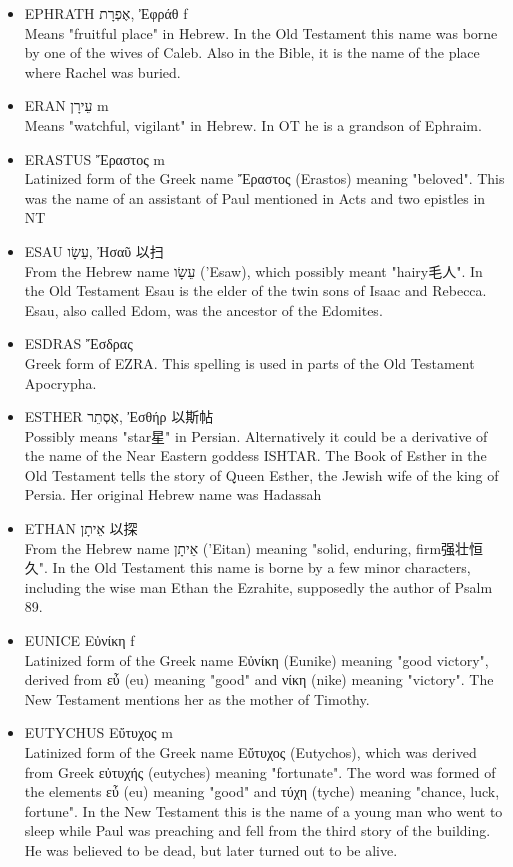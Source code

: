 \begin{itemize}
\item {EPHRATH אֶפְרָת, Ἐφράθ f}\\
Means "fruitful place" in Hebrew. In the Old Testament this name was borne by one of the wives of Caleb. Also in the Bible, it is the name of the place where Rachel was buried.

\item {ERAN עֵירָן m}\\
Means "watchful, vigilant" in Hebrew. In OT he is a grandson of Ephraim.

\item {ERASTUS Ἔραστος m}\\
Latinized form of the Greek name Ἔραστος (Erastos) meaning "beloved". This was the name of an assistant of Paul mentioned in Acts and two epistles in NT

\item {ESAU עֵשָׂו, Ἠσαῦ 以扫}\\
From the Hebrew name עֵשָׂו ('Esaw), which possibly meant "hairy毛人". In the Old Testament Esau is the elder of the twin sons of Isaac and Rebecca. Esau, also called Edom, was the ancestor of the Edomites.

\item {ESDRAS Ἔσδρας }\\
Greek form of EZRA. This spelling is used in parts of the Old Testament Apocrypha.

\item {ESTHER אֶסְתֵר, Ἐσθήρ 以斯帖}\\
Possibly means "star星" in Persian. Alternatively it could be a derivative of the name of the Near Eastern goddess ISHTAR. The Book of Esther in the Old Testament tells the story of Queen Esther, the Jewish wife of the king of Persia. Her original Hebrew name was Hadassah

\item {ETHAN אֵיתָן 以探}\\
From the Hebrew name אֵיתָן ('Eitan) meaning "solid, enduring, firm强壮恒久". In the Old Testament this name is borne by a few minor characters, including the wise man Ethan the Ezrahite, supposedly the author of Psalm 89. 

\item {EUNICE Εὐνίκη f}\\
Latinized form of the Greek name Εὐνίκη (Eunike) meaning "good victory", derived from εὖ (eu) meaning "good" and νίκη (nike) meaning "victory". The New Testament mentions her as the mother of Timothy. 

\item {EUTYCHUS Εὔτυχος m}\\
Latinized form of the Greek name Εὔτυχος (Eutychos), which was derived from Greek εὐτυχής (eutyches) meaning "fortunate". The word was formed of the elements εὖ (eu) meaning "good" and τύχη (tyche) meaning "chance, luck, fortune". In the New Testament this is the name of a young man who went to sleep while Paul was preaching and fell from the third story of the building. He was believed to be dead, but later turned out to be alive.


\end{itemize}
